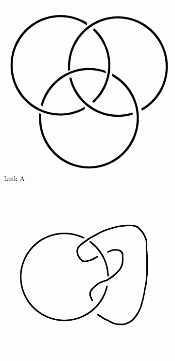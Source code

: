 \documentclass[12pt,letterpaper]{article}
\theoremstyle{definition}
\begin{document}
\begin{figure}[h!]
    \centering
    \begin{subfigure}{.3\textwidth}
        \centering
        \includegraphics[width=\textwidth]{knotpics/borromean.png}
        \caption{Link A}
    \end{subfigure}
    \hspace{.5cm}
    \begin{subfigure}{.3\textwidth}
        \centering
        \includegraphics[width=\textwidth]{knotpics/lno2.png}

\end{subfigure}
\end{figure}
\end{document}
